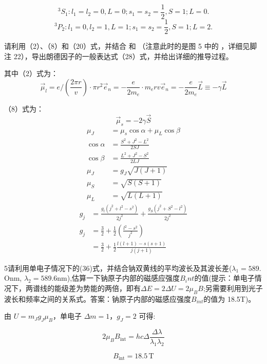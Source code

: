 \documentclass[dvipsnames, svgnames,a4paper,11pt]{article}
\begin{document}
$$^3S_1\colon l_1=l_2=0,L=0;s_1=s_2=\frac12,S=1;L=0.$$
$$^3P_2\colon l_1=0,l_2=1,L=1;s_1=s_2=\frac12,S=1;L=2.$$
\begin{question}
	请利用（2）、（8）和（20）式，并结合 和 （注意此时的是图 5 中的 ，详细见脚注 22），导出朗德因子的一般表达式（28）式，并给出详细的推导过程。
\end{question}
	其中（2）式为：
	$$\vec{\mu}_{l}=e/\left(\frac{2\pi r}{v}\right)\cdot\pi r^{2}\vec{e}_{n}=-\frac{e}{2m_{e}}\cdot m_{e}rv\vec{e}_{n}=-\frac{e}{2m_{e}}\vec{L}\equiv-\gamma\vec{L}$$

	（8）式为：
$$\vec{\mu}_s=-2\gamma\vec{S}$$
	\begin{align*}
		\mu_{J} &= \mu_{s} \cos \alpha + \mu_{L} \cos \beta \\
		\cos \alpha &= \frac{S^2 + J^2 - L^2}{2SJ} \\
		\cos \beta &= \frac{L^2 + J^2 - S^2}{2LJ} \\
		\mu_{J} &= g_{J} \sqrt{J(J+1)} \\
		\mu_{S} &= \sqrt{S(S+1)} \\
		\mu_{L} &= \sqrt{L(L+1)}
		\end{align*}
		\begin{align*}
			g_j &= \frac{g_l(j^2 + l^2 - s^2)}{2j^2} + \frac{g_S(j^2 + S^2 - l^2)}{2j^2} \\
			g_j &= \frac{3}{2} + \frac{1}{2} \left(\frac{l^2 - s^2}{j^2}\right) \\
			&= \frac{3}{2} + \frac{1}{2} \frac{l(l+1) - s(s+1)}{j(j+1)}
			\end{align*}
	
			\begin{question}
				5请利用单电子情况下的(36)式，并结合钠双黄线的平均波长及其波长差($\lambda_1=589.$Onm, $\lambda_{2}=589.6$nm),估算一下钠原子内部的磁感应强度$B_int$的值(提示：单电子情况下，两谱线的能级差为势能的两倍，即有$\Delta E=2\Delta U=2\mu_BB$;另需要利用到光子波长和频率之间的关系式。答案：钠原子内部的磁感应强度$B_{int}$的值为 18.5T)。
			\end{question}

			由 $U = m_J g_J \mu_B$，单电子 $\Delta m = 1$，$g_J = 2$ 可得:

\begin{equation}
2\mu_B B_{\text{int}} = hc \Delta \frac{\Delta \lambda}{\lambda_1 \lambda_2}
\end{equation}

\begin{equation}
B_{\text{int}} = 18.5\, \text{T}
\end{equation}
\end{document}
